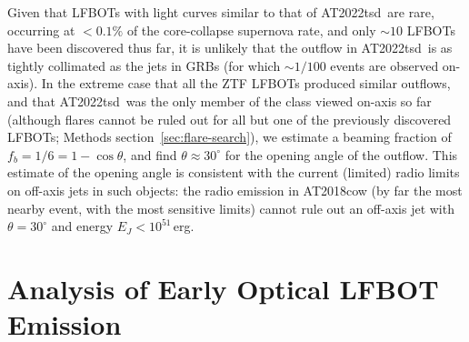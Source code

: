 \documentclass{nature_plusfigure}
\newcommand{\at}{AT2022tsd}
\begin{document}
\begin{methods}
Given that LFBOTs with light curves similar to that of \at\ are rare, occurring at $<0.1\%$ of the core-collapse supernova rate\cite{Ho2023}, and only $\sim10$ LFBOTs have been discovered thus far, it is unlikely that the outflow in \at\ is as tightly collimated as the jets in GRBs (for which $\sim1/100$ events are observed on-axis).
In the extreme case that all the ZTF LFBOTs produced similar outflows, and that \at\ was the only member of the class viewed on-axis so far (although flares cannot be ruled out for all but one of the previously discovered LFBOTs; Methods section~\ref{sec:flare-search}), we estimate a beaming fraction of $f_b = 1/6 = 1-\cos{\theta}$, and find $\theta\approx30^{\circ}$ for the opening angle of the outflow. This estimate of the opening angle is consistent with the current (limited) radio limits on off-axis jets in such objects: the radio emission in AT2018cow (by far the most nearby event, with the most sensitive limits) cannot\cite{Margutti2019} rule out an off-axis jet with $\theta=30^{\circ}$ and energy $E_J<10^{51}\,$erg.%

\section{Analysis of Early Optical LFBOT Emission}
\label{sec:lfbot-lc-analysis}



\end{methods}
\end{document}
